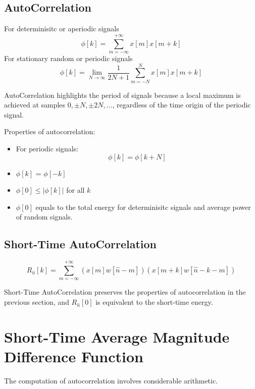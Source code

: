 \subsection{AutoCorrelation}
\begin{definition}[AutoCorrelation]
    For determinisitc or aperiodic signals
    \[ \phi[k] = \sum_{m=-\infty}^{+\infty}x[m]x[m+k] \]
    For stationary random or periodic signals
    \[ \phi[k] = \lim_{N\to\infty}\frac{1}{2N+1}\sum_{m=-N}^{N}x[m]x[m+k] \]
\end{definition}
\begin{remark}
    AutoCorrelation highlights the period of signals because a local maximum is achieved at samples $0, \pm N, \pm 2N, \dots$, regardless of the time origin of the periodic signal.
\end{remark}
\begin{proposition}
    Properties of autocorrelation:
    \begin{itemize}
        \item For periodic signals: 
        \[ \phi[k] = \phi[k+N] \]
        \item $\phi[k]$ = $\phi[-k]$
        \item $\phi[0] \le |\phi[k]|$ for all $k$
        \item $\phi[0]$ equals to the total energy for determinisitc signals and average power of random signals.
    \end{itemize}
\end{proposition}

\subsection{Short-Time AutoCorrelation}
\begin{definition}
    \[ R_{\hat{n}}[k] = \sum_{m=-\infty}^{+\infty}(x[m]w[\hat{n}-m])(x[m+k]w[\hat{n}-k-m]) \]
\end{definition}
\begin{remark}
    Short-Time AutoCorrelation preserves the properties of autocorrelation in the previous section, and $R_{\hat{n}}[0]$ is equivalent to the short-time energy.
\end{remark}

\section{Short-Time Average Magnitude Difference Function}
The computation of autocorrelation involves considerable arithmetic.


